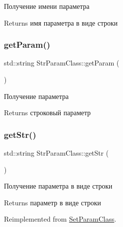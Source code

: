 Получение имени параметра 

\begin{DoxyReturn}{Returns}
имя параметра в виде строки 
\end{DoxyReturn}
\mbox{\label{class_str_param_class_a2c6bbb474c373d1ed4a833de4b1c7e64}} 
\subsubsection{\texorpdfstring{get\+Param()}{getParam()}}
{\footnotesize\ttfamily std\+::string Str\+Param\+Class\+::get\+Param (\begin{DoxyParamCaption}{ }\end{DoxyParamCaption})}



Получение параметра 

\begin{DoxyReturn}{Returns}
строковый параметр 
\end{DoxyReturn}
\mbox{\label{class_str_param_class_a8a10ac8f8780d0d66099ba24245487ea}} 
\subsubsection{\texorpdfstring{get\+Str()}{getStr()}}
{\footnotesize\ttfamily std\+::string Str\+Param\+Class\+::get\+Str (\begin{DoxyParamCaption}{ }\end{DoxyParamCaption})\hspace{0.3cm}{\ttfamily [virtual]}}



Получение параметра в виде строки 

\begin{DoxyReturn}{Returns}
параметр в виде строки 
\end{DoxyReturn}


Reimplemented from \hyperlink{class_set_param_class_a44f3924827807beb6805867a0305e8c9}{Set\+Param\+Class}.

\mbox{\label{class_set_param_class_aeabf85ad5a078ab4abb8f09a67f2c8e0}} 
